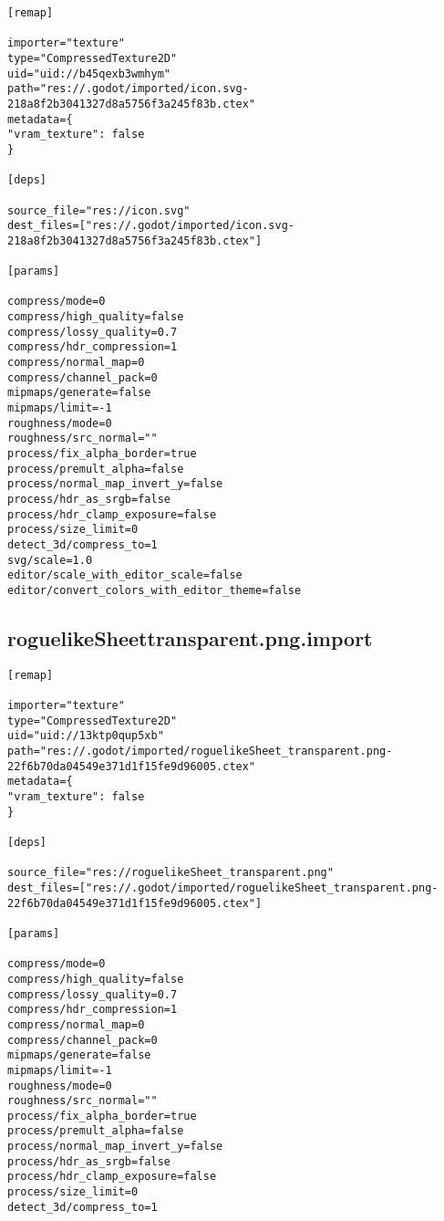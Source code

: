 \begin{lstlisting}
[remap]

importer="texture"
type="CompressedTexture2D"
uid="uid://b45qexb3wmhym"
path="res://.godot/imported/icon.svg-218a8f2b3041327d8a5756f3a245f83b.ctex"
metadata={
"vram_texture": false
}

[deps]

source_file="res://icon.svg"
dest_files=["res://.godot/imported/icon.svg-218a8f2b3041327d8a5756f3a245f83b.ctex"]

[params]

compress/mode=0
compress/high_quality=false
compress/lossy_quality=0.7
compress/hdr_compression=1
compress/normal_map=0
compress/channel_pack=0
mipmaps/generate=false
mipmaps/limit=-1
roughness/mode=0
roughness/src_normal=""
process/fix_alpha_border=true
process/premult_alpha=false
process/normal_map_invert_y=false
process/hdr_as_srgb=false
process/hdr_clamp_exposure=false
process/size_limit=0
detect_3d/compress_to=1
svg/scale=1.0
editor/scale_with_editor_scale=false
editor/convert_colors_with_editor_theme=false
\end{lstlisting}

\subsection{roguelikeSheet\textunderscore{}transparent.png.import}

\begin{lstlisting}
[remap]

importer="texture"
type="CompressedTexture2D"
uid="uid://13ktp0qup5xb"
path="res://.godot/imported/roguelikeSheet_transparent.png-22f6b70da04549e371d1f15fe9d96005.ctex"
metadata={
"vram_texture": false
}

[deps]

source_file="res://roguelikeSheet_transparent.png"
dest_files=["res://.godot/imported/roguelikeSheet_transparent.png-22f6b70da04549e371d1f15fe9d96005.ctex"]

[params]

compress/mode=0
compress/high_quality=false
compress/lossy_quality=0.7
compress/hdr_compression=1
compress/normal_map=0
compress/channel_pack=0
mipmaps/generate=false
mipmaps/limit=-1
roughness/mode=0
roughness/src_normal=""
process/fix_alpha_border=true
process/premult_alpha=false
process/normal_map_invert_y=false
process/hdr_as_srgb=false
process/hdr_clamp_exposure=false
process/size_limit=0
detect_3d/compress_to=1
\end{lstlisting}

